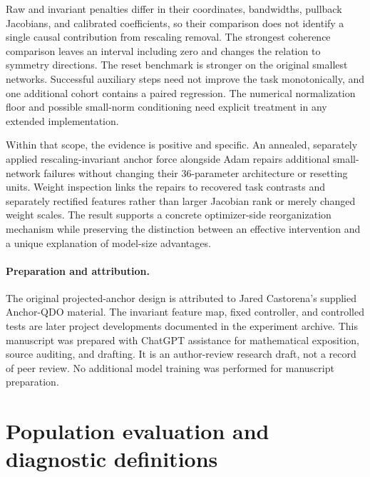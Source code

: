 \documentclass[11pt,letterpaper]{article}
\theoremstyle{remark}\newtheorem{remark}{Remark}
\begin{document}
Raw and invariant penalties differ in their coordinates, bandwidths, pullback Jacobians, and calibrated coefficients, so their comparison does not identify a single causal contribution from rescaling removal. The strongest coherence comparison leaves an interval including zero and changes the relation to symmetry directions. The reset benchmark is stronger on the original smallest networks. Successful auxiliary steps need not improve the task monotonically, and one additional cohort contains a paired regression. The numerical normalization floor and possible small-norm conditioning need explicit treatment in any extended implementation.

Within that scope, the evidence is positive and specific. An annealed, separately applied rescaling-invariant anchor force alongside Adam repairs additional small-network failures without changing their 36-parameter architecture or resetting units. Weight inspection links the repairs to recovered task contrasts and separately rectified features rather than larger Jacobian rank or merely changed weight scales. The result supports a concrete optimizer-side reorganization mechanism while preserving the distinction between an effective intervention and a unique explanation of model-size advantages.

\paragraph{Preparation and attribution.}
The original projected-anchor design is attributed to Jared Castorena's supplied Anchor-QDO material. The invariant feature map, fixed controller, and controlled tests are later project developments documented in the experiment archive. This manuscript was prepared with ChatGPT assistance for mathematical exposition, source auditing, and drafting. It is an author-review research draft, not a record of peer review. No additional model training was performed for manuscript preparation.

\clearpage
\appendix
\section{Population evaluation and diagnostic definitions}\label{app:diagnostics}
\end{document}
